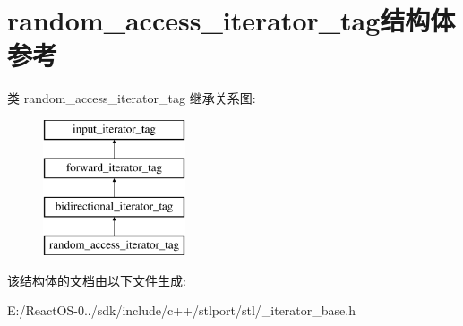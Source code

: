 \hypertarget{structrandom__access__iterator__tag}{}\section{random\+\_\+access\+\_\+iterator\+\_\+tag结构体 参考}
\label{structrandom__access__iterator__tag}
类 random\+\_\+access\+\_\+iterator\+\_\+tag 继承关系图\+:\begin{figure}[H]
\begin{center}
\leavevmode
\includegraphics[height=4.000000cm]{structrandom__access__iterator__tag}
\end{center}
\end{figure}


该结构体的文档由以下文件生成\+:\begin{DoxyCompactItemize}
\item 
E\+:/\+React\+O\+S-\/0../sdk/include/c++/stlport/stl/\+\_\+iterator\+\_\+base.\+h\end{DoxyCompactItemize}
